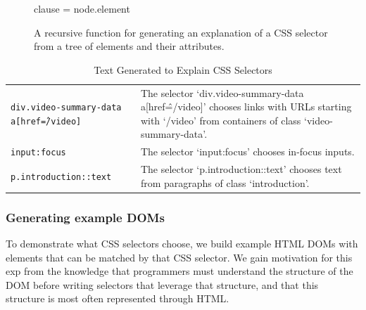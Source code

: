 \begin{figure}
\begin{algorithmic}

        clause = node.element
    \Else{}
    \EndIf{}
    \EndIf{}
    \EndIf{}
\EndFunction{}

\end{algorithmic}
\caption{A recursive function for generating an explanation of a CSS selector from a tree of elements and their attributes.}
\label{alg:css_traversal}
\end{figure}


\begin{table}[t]
\caption{Text Generated to Explain CSS Selectors}
\label{tab:css_descriptions}
\centering
\begin{tabular}{ST}
\toprule
{} &  \\
\midrule
\texttt{div.video-summary-data a[href\^=/video]} & The selector `div.video-summary-data a[href\^=/video]' chooses links with URLs starting with `/video' from containers of class `video-summary-data'. \\ \midrule
\texttt{input:focus} & The selector `input:focus' chooses in-focus inputs. \\ \midrule
\texttt{p.introduction::text} & The selector `p.introduction::text' chooses text from paragraphs of class `introduction'. \\ \bottomrule
\end{tabular}
\end{table}

\subsubsection{Generating example DOMs}

To demonstrate what CSS selectors choose, we build example HTML DOMs with elements that can be matched by that CSS selector.
We gain motivation for this \gls{exp} from the knowledge that programmers must understand the structure of the DOM before writing selectors that leverage that structure, and that this structure is most often represented through HTML\@.

